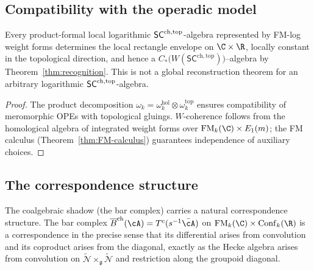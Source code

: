 \subsection{Compatibility with the operadic model}
\label{subsec:operadic-compatibility}

\begin{proposition}
\label{prop:compatibility}
Every product-formal local logarithmic $\mathsf{SC}^{\mathrm{ch},\mathrm{top}}$-algebra represented
by FM-log weight forms determines the local rectangle envelope on
$\C\times\R$, locally constant in the topological direction, and hence
a
$C_\ast\!\bigl(W(\mathsf{SC}^{\mathrm{ch,top}})\bigr)$--algebra by
Theorem~\ref{thm:recognition}. This is not a global reconstruction
theorem for an arbitrary logarithmic $\mathsf{SC}^{\mathrm{ch},\mathrm{top}}$-algebra.
\end{proposition}

\begin{proof}
The product decomposition $\omega_k = \omega_k^{\mathrm{hol}} \otimes \omega_k^{\mathrm{top}}$ ensures compatibility of meromorphic OPEs with topological gluings. $W$-coherence follows from the homological algebra of integrated weight forms over $\FM_k(\C)\times E_1(m)$; the FM calculus (Theorem~\ref{thm:FM-calculus}) guarantees independence of auxiliary choices.
\end{proof}

\subsection{The correspondence structure}
\label{subsec:correspondence-structure}

The coalgebraic
shadow (the bar complex) carries a natural correspondence
structure. The bar complex $\barB^{\mathrm{ch}}(\cA) =
T^c(s^{-1}\bar{\cA})$ on $\FM_k(\C) \times \Conf_k(\R)$ is a
correspondence in the precise sense that its differential arises from
convolution and its coproduct arises from the diagonal, exactly as
the Hecke algebra arises from convolution on $\widetilde{\mathcal N}
\times_{\mathfrak g} \widetilde{\mathcal N}$ and restriction along
the groupoid diagonal.

